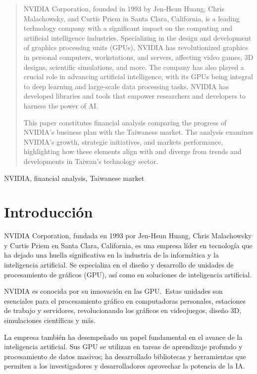\documentclass[conference]{IEEEtran}
\begin{document}
\begin{abstract}
	NVIDIA Corporation, founded in 1993 by Jen-Hsun Huang, Chris
	Malachowsky, and Curtis Priem in Santa Clara, California,
	is a leading technology company with a significant impact
	on the computing and artificial intelligence industries.
	Specializing in the design and development of graphics
	processing units (GPUs), NVIDIA has revolutionized graphics
	in personal computers, workstations, and servers, affecting
	video games, 3D designs, scientific simulations, and more. The
	company has also played a crucial role in advancing artificial
	intelligence, with its GPUs being integral to deep learning
	and large-scale data processing tasks. NVIDIA has developed
	libraries and tools that empower researchers and developers
	to harness the power of AI.\@{}

	This paper constitutes financial analysis comparing the
	progress of NVIDIA's business plan with the Taiwanese
	market. The analysis examines NVIDIA's growth, strategic
	initiatives, and markets performance, highlighting how
	these elements align with and diverge from trends and
	developments in Taiwan's technology sector.
\end{abstract}

\begin{IEEEkeywords}
	NVIDIA, financial analysis, Taiwanese market
\end{IEEEkeywords}

\nocite{*}

\section{Introducción}

NVIDIA Corporation, fundada en 1993 por Jen-Hsun Huang, Chris
Malachowsky y Curtis Priem en Santa Clara, California, es una
empresa líder en tecnología que ha dejado una huella
significativa en la industria de la informática y la
inteligencia artificial. Se especializa en el diseño y
desarrollo de unidades de procesamiento de gráficos (GPU),
así como en soluciones de inteligencia artificial.

NVIDIA es conocida por su innovación en las GPU.~Estas unidades
son esenciales para el procesamiento gráfico en computadoras
personales, estaciones de trabajo y servidores, revolucionando
los gráficos en videojuegos, diseño 3D, simulaciones científicas
y más.

La empresa también ha desempeñado un papel fundamental en
el avance de la inteligencia artificial. Sus GPU se utilizan
en tareas de aprendizaje profundo y procesamiento de datos
masivos; ha desarrollado bibliotecas y herramientas que
permiten a los investigadores y desarrolladores aprovechar
la potencia de la IA.\@{}
\end{document}
